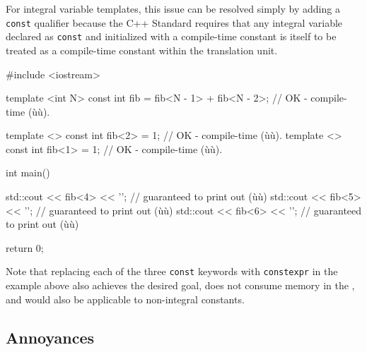 \noindent For integral variable templates, this issue can be resolved simply by adding a \lstinline!const! qualifier because the C++ Standard requires that any integral variable declared as \lstinline!const! and initialized with a compile-time constant is itself to be treated as a compile-time constant within the translation unit. 

\begin{emcppslisting}[language=C++]
#include <iostream>

template <int N>
const int fib = fib<N - 1> + fib<N - 2>;  // OK - compile-time (ù{}ù).

template <> const int fib<2> = 1;         // OK - compile-time (ù{}ù).
template <> const int fib<1> = 1;         // OK - compile-time (ù{}ù).

int main()
{
    std::cout << fib<4> << '\n';  // guaranteed to print out (ù{}ù)
    std::cout << fib<5> << '\n';  // guaranteed to print out (ù{}ù)
    std::cout << fib<6> << '\n';  // guaranteed to print out (ù{}ù)

    return 0;
}
\end{emcppslisting}
    
\noindent Note that replacing each of the three \lstinline!const! keywords with
\lstinline!constexpr! in the example above also achieves the
desired goal, does not consume memory in the , and would also be applicable to non-integral constants.

\subsection[Annoyances]{Annoyances}\label{annoyances}

